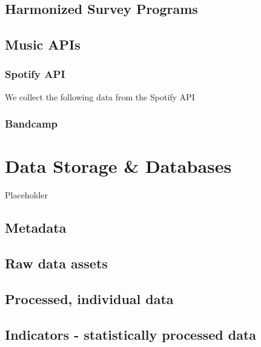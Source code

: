 \documentclass[
  fontsize=13pt,
  english,
  a4paper,
  openany, a4paper, oneside]{book}
\begin{document}
\hypertarget{harmonized-survey-programs}{%
\section{Harmonized Survey Programs}\label{harmonized-survey-programs}}

\hypertarget{music-apis}{%
\section{Music APIs}\label{music-apis}}

\hypertarget{spotify-api}{%
\subsection{Spotify API}\label{spotify-api}}

We collect the following data from the Spotify API

\hypertarget{bandcamp}{%
\subsection{Bandcamp}\label{bandcamp}}

\hypertarget{data-storage}{%
\chapter{Data Storage \& Databases}\label{data-storage}}

Placeholder

\hypertarget{storage-metadata}{%
\section{Metadata}\label{storage-metadata}}

\hypertarget{dta-raw}{%
\section{Raw data assets}\label{dta-raw}}

\hypertarget{processed-individual-data}{%
\section{Processed, individual data}\label{processed-individual-data}}

\hypertarget{indicators---statistically-processed-data}{%
\section{Indicators - statistically processed data}\label{indicators---statistically-processed-data}}
\end{document}
